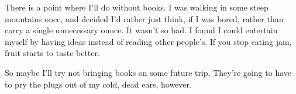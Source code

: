 There is a point where I'll do without
                  books. I was walking in some steep mountains once, and decided
                  I'd rather just think, if I was bored, rather than carry a
                  single unnecessary ounce. It wasn't so bad. I found I could
                  entertain myself by having ideas instead of reading other
                  people's. If you stop eating jam, fruit starts to taste
                  better.

So maybe I'll try not bringing books on
                  some future trip. They're going to have to pry the plugs out
                  of my cold, dead ears, however.



              
            
          
